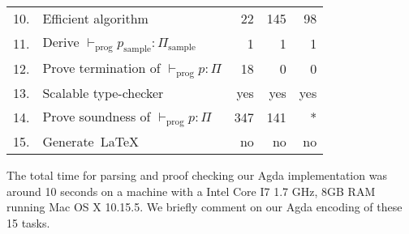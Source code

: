 \documentclass[review]{elsarticle}
\theoremstyle{definition}
\begin{document}
\begin{table}[!htb]
\begin{tabular}{rl|rrr}
10. & Efficient algorithm                          & 22                        & 145                     & 98                       \\
11. & Derive $\vdash_{\textrm{prog}} p_{\textrm{sample}} : \Pi_{\textrm{sample}}$
                                                   & 1                         & 1                       & 1                        \\
12. & Prove termination of $\vdash_{\textrm{prog}} p : \Pi$
                                                   & 18                        & 0                       & 0                        \\
13. & Scalable type-checker                        & yes                       & yes                     & yes                      \\
14. & Prove soundness of $\vdash_{\textrm{prog}} p : \Pi$
                                                   & 347                       & 141                     & *                        \\
15. & Generate~\LaTeX                              & no                        & no                      & no
\end{tabular}
\end{table}

The total time for parsing and proof checking our Agda implementation was around 10 seconds
on a machine with a Intel Core I7 1.7 GHz, 8GB RAM running Mac OS X 10.15.5. We briefly comment
on our Agda encoding of these 15 tasks.
\end{document}
